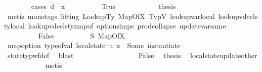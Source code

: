 \begin{isabellebody}
\ \ \ \ \ \ \isamarkupfalse%
\ {\isacharparenleft}{\kern0pt}cases\ {\isachardoublequoteopen}d\ {\isacharequal}{\kern0pt}\ x{\isachardoublequoteclose}{\isacharparenright}{\kern0pt}\isanewline
\ \ \ \ \ \ \ \ \isamarkupfalse%
\ True\isanewline
\ \ \ \ \ \ \ \ \isamarkupfalse%
\ \isamarkupfalse%
\ {\isacharquery}{\kern0pt}thesis\ \isanewline
\ \ \ \ \ \ \ \ \isamarkupfalse%
\ {\isacharparenleft}{\kern0pt}metis\ {\isacharparenleft}{\kern0pt}mono{\isacharunderscore}{\kern0pt}tags{\isacharcomma}{\kern0pt}\ lifting{\isacharparenright}{\kern0pt}\ LookupTy\ MapOfX\ TypV\ lookup{\isacharunderscore}{\kern0pt}var{\isacharunderscore}{\kern0pt}local\ lookup{\isacharunderscore}{\kern0pt}vdecls{\isacharunderscore}{\kern0pt}ty{\isacharunderscore}{\kern0pt}local{\isacharunderscore}{\kern0pt}{}\ lookup{\isacharunderscore}{\kern0pt}vdecls{\isacharunderscore}{\kern0pt}ty{\isacharunderscore}{\kern0pt}map{\isacharunderscore}{\kern0pt}of\ option{\isachardot}{\kern0pt}simps{\isacharparenleft}{\kern0pt}{}{\isacharparenright}{\kern0pt}\ prod{\isachardot}{\kern0pt}collapse\ update{\isacharunderscore}{\kern0pt}var{\isacharunderscore}{\kern0pt}same{\isacharparenright}{\kern0pt}\isanewline
\ \ \ \ \ \ \isamarkupfalse%
\isanewline
\ \ \ \ \ \ \ \ \isamarkupfalse%
\ False\isanewline
\ \ \ \ \ \ \ \ \isamarkupfalse%
\ S{}\ MapOfX\ \isamarkupfalse%
\ {\isachardoublequoteopen}map{\isacharunderscore}{\kern0pt}option\ type{\isacharunderscore}{\kern0pt}of{\isacharunderscore}{\kern0pt}val\ {\isacharparenleft}{\kern0pt}local{\isacharunderscore}{\kern0pt}state\ u\ x{\isacharparenright}{\kern0pt}\ {\isacharequal}{\kern0pt}\ Some\ {\isacharparenleft}{\kern0pt}instantiate\ {\isasymOmega}\ {\isasymtau}{\isacharprime}{\kern0pt}{\isacharparenright}{\kern0pt}{\isachardoublequoteclose}\isanewline
\ \ \ \ \ \ \ \ \ \ \isamarkupfalse%
\ state{\isacharunderscore}{\kern0pt}typ{\isacharunderscore}{\kern0pt}wf{\isacharunderscore}{\kern0pt}def\ \isamarkupfalse%
\ blast\ \ \ \ \ \ \ \ \isanewline
\ \ \ \ \ \ \ \ \isamarkupfalse%
\ False\ \isamarkupfalse%
\ {\isacharquery}{\kern0pt}thesis\ \isamarkupfalse%
\ local{\isacharunderscore}{\kern0pt}state{\isacharunderscore}{\kern0pt}update{\isacharunderscore}{\kern0pt}other\isanewline
\ \ \ \ \ \ \ \ \ \ \isamarkupfalse%
\ metis\isanewline

\end{isabellebody}
